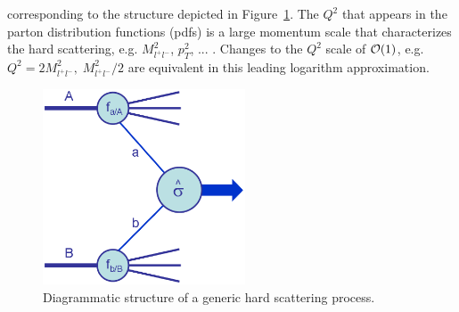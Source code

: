 \documentclass[12pt]{iopart}
\begin{document}
corresponding to the structure depicted in Figure~\ref{basicstruct}. The $Q^2$ that appears in the parton
distribution functions (pdfs) is a large momentum scale that characterizes the hard scattering, e.g.
$M_{l^+l^-}^2$, $p_T^2$, ... . Changes to the $Q^2$  scale of ${\cal O}(1)$, e.g. $Q^2 = 2 M_{l^+l^-}^2, \;
M_{l^+l^-}^2/2 $ are equivalent in this leading logarithm approximation.
%
\begin{figure}[htbp]
\begin{center}    
\includegraphics[width=6cm]{Hardscattering.eps}
\end{center}    
\vspace*{-0.5cm}
\caption{Diagrammatic structure of a generic hard scattering process.}
\label{basicstruct}
\end{figure}
\end{document}
